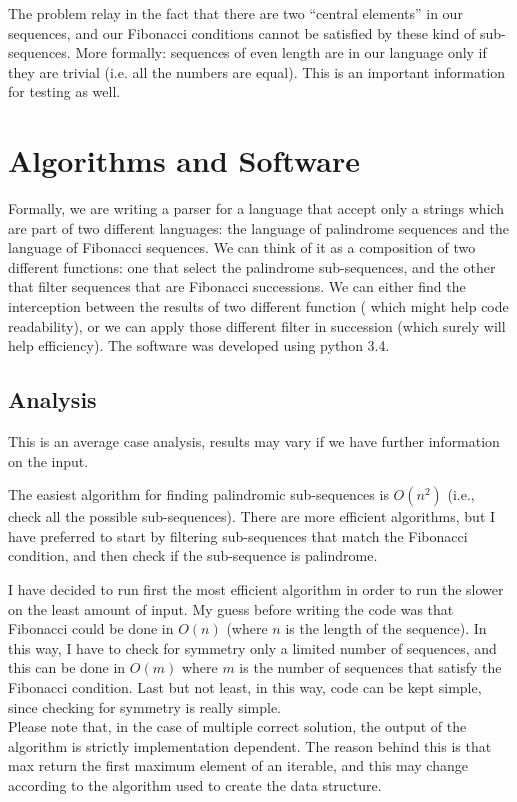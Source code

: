 \documentclass[12pt]{article}
\begin{document}
The problem relay in the fact that there are two ``central elements'' in our sequences, and our Fibonacci conditions cannot be satisfied by these kind of sub-sequences. More formally: sequences of even length are in our language only if they are trivial (i.e. all the numbers are equal). This is an important information for testing as well.

\section{Algorithms and Software}
Formally, we are writing a parser for a language that accept only a strings which are part of two different languages: the language of palindrome sequences and the language of Fibonacci sequences. We can think of it as a composition of two different functions: one that select the palindrome sub-sequences, and the other that filter sequences that are Fibonacci successions. We can either find the interception between the results of two different function ( which might help code readability), or we can apply those different filter in succession (which surely will help efficiency). The software was developed using python 3.4.

\subsection{Analysis}
This is an average case analysis, results may vary if we have further information on the input.

The easiest algorithm for finding palindromic sub-sequences is $O(n^2)$ (i.e., check all the possible sub-sequences). There are more efficient algorithms, but I have preferred to start by filtering sub-sequences that match the Fibonacci condition, and then check if the sub-sequence is palindrome. 

I have decided to run first the most efficient algorithm in order to run the slower on the least amount of input. My guess before writing the code was that Fibonacci could be done in  $O(n)$ (where $n$ is the length of the sequence). In this way, I have to check for symmetry only a limited number of sequences, and this can be done in $O(m)$ where $m$ is the number of sequences that satisfy the Fibonacci condition. Last but not least, in this way, code can be kept simple, since checking for symmetry is really simple. \\

Please note that, in the case of multiple correct solution, the output of the algorithm is strictly implementation dependent. The reason behind this is that max return the first maximum element of an iterable, and this may change according to the algorithm used to create the data structure. 
\end{document}
